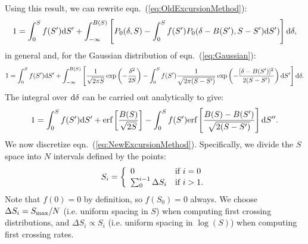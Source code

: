 Using this result, we can rewrite eqn.~(\ref{eq:OldExcursionMethod}):
\begin{equation}
  1 = \int_0^S f(S^\prime){\rm d}S^\prime + \int_{-\infty}^{B(S)} \left[ P_0(\delta,S) -  \int_{0}^{S} f(S^\prime) P_0(\delta - B(S^\prime),S - S^\prime){\rm d}S^\prime )\right] {\rm d} \delta ,
\end{equation}
in general and, for the Gaussian distribution of eqn.~(\ref{eq:Gaussian}):
\begin{equation}
  1 =  \int_0^S f(S^\prime){\rm d}S^\prime + \int_{-\infty}^{B(S)} \left[ \frac{1}{\sqrt{2 \pi S}} \exp\left(-\frac{\delta^2}{2 S}\right) -  \int_{0}^{S} f(S^\prime) \frac{1}{\sqrt{2 \pi (S-S^\prime)}} \exp\left(-\frac{[\delta - B(S^\prime)]^2}{2 (S-S^\prime)}\right){\rm d}S^\prime \right] {\rm d} \delta .
\end{equation}
The integral over ${\rm d}\delta$ can be carried out analytically to give:
\begin{equation}
 1 =  \int_0^S f(S^\prime){\rm d}S^\prime+  \hbox{erf}\left[\frac{B(S)}{\sqrt{2S}}\right]  -  \int_{0}^{S}  f(S^\prime)  \hbox{erf}\left[\frac{B(S) - B(S^\prime)}{\sqrt{2 (S-S^\prime)}}\right] {\rm d}S^{\prime\prime}.
\label{eq:NewExcursionMethod}
\end{equation}
We now discretize eqn.~(\ref{eq:NewExcursionMethod}). Specifically, we divide the $S$ space into $N$ intervals defined by the points:
\begin{equation}
  S_i = \left\{ \begin{array}{ll}
                 0 & \hbox{if } i=0 \\
                 \sum_0^{i-1} \Delta S_i & \hbox{if } i > 1.
                \end{array}
        \right.
\end{equation}
Note that $f(0)=0$ by definition, so $f(S_0)=0$ always. We choose $\Delta S_i = S_{\rm max}/N$ (i.e. uniform spacing in $S$) when computing first crossing distributions, and $\Delta S_i \propto S_i$ (i.e. uniform spacing in $\log(S)$) when computing first crossing rates.

